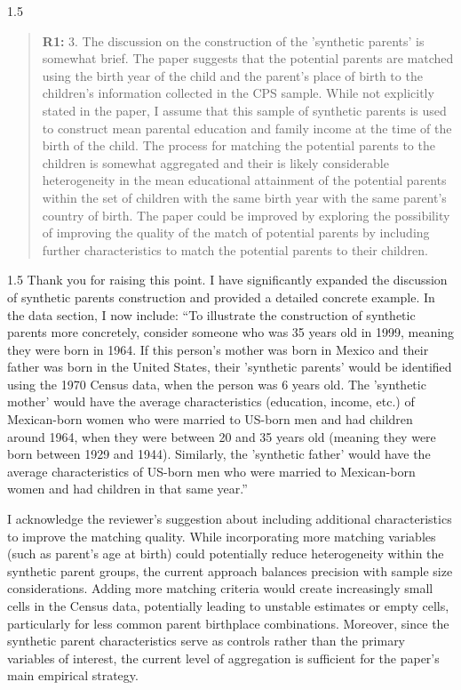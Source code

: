 \documentclass[12pt,english]{article}
\newcommand{\rrxspc}{1.5}
\begin{document}
\begin{refsection}
\begin{spacing}{\rrxspc}
    \begin{quotation}
        \textbf{R1: } 3. The discussion on the construction of the 'synthetic parents' is somewhat brief. The paper suggests that the potential parents are matched using the birth year of the child and the parent's place of birth to the children's information collected in the CPS sample. While not explicitly stated in the paper, I assume that this sample of synthetic parents is used to construct mean parental education and family income at the time of the birth of the child. The process for matching the potential parents to the children is somewhat aggregated and their is likely considerable heterogeneity in the mean educational attainment of the potential parents within the set of children with the same birth year with the same parent's country of birth. The paper could be improved by exploring the possibility of improving the quality of the match of potential parents by including further characteristics to match the potential parents to their children.
\end{quotation}
    \end{spacing}
        
\begin{spacing}{\rrxspc}
        Thank you for raising this point. I have significantly expanded the discussion of synthetic parents construction and provided a detailed concrete example. In the data section, I now include: ``To illustrate the construction of synthetic parents more concretely, consider someone who was 35 years old in 1999, meaning they were born in 1964. If this person's mother was born in Mexico and their father was born in the United States, their 'synthetic parents' would be identified using the 1970 Census data, when the person was 6 years old. The 'synthetic mother' would have the average characteristics (education, income, etc.) of Mexican-born women who were married to US-born men and had children around 1964, when they were between 20 and 35 years old (meaning they were born between 1929 and 1944). Similarly, the 'synthetic father' would have the average characteristics of US-born men who were married to Mexican-born women and had children in that same year.''

        I acknowledge the reviewer's suggestion about including additional characteristics to improve the matching quality. While incorporating more matching variables (such as parent's age at birth) could potentially reduce heterogeneity within the synthetic parent groups, the current approach balances precision with sample size considerations. Adding more matching criteria would create increasingly small cells in the Census data, potentially leading to unstable estimates or empty cells, particularly for less common parent birthplace combinations. Moreover, since the synthetic parent characteristics serve as controls rather than the primary variables of interest, the current level of aggregation is sufficient for the paper's main empirical strategy. 
\end{spacing}


\end{refsection}
\end{document}
